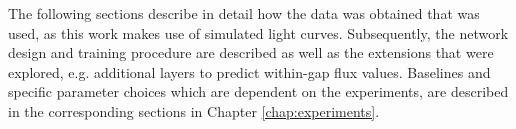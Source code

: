 
The following sections describe in detail how the data was obtained that was used, as this work makes use of simulated light curves. Subsequently, the network design and training procedure are described as well as the extensions that were explored, e.g. additional layers to predict within-gap flux values. Baselines and specific parameter choices which are dependent on the experiments, are described in the corresponding sections in Chapter \ref{chap:experiments}.

